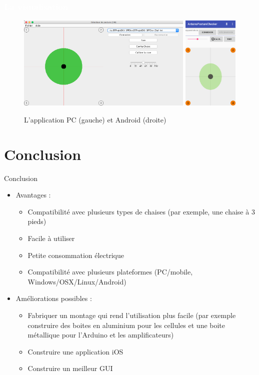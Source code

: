 \documentclass{beamer}
\begin{document}
\begin{frame}
\frametitle{\textcolor{white}{La visualisation}}
\begin{figure}[htbp]
\begin{center}
\includegraphics[height=4.5cm]{images/screenshot_pc1}
\includegraphics[height=4.5cm]{images/screenshot_android1.png}
\end{center}
\caption{L'application PC (gauche) et Android (droite)}
\label{fig:screenshot_pc}
\end{figure}
\end{frame}

\section{Conclusion}
\begin{frame}
\begin{block}{Conclusion}
\begin{itemize}
\item Avantages :
\begin{itemize}
\item Compatibilité avec plusieurs types de chaises (par exemple, une chaise à 3 pieds)
\item Facile à utiliser
\item Petite consommation électrique 
\item Compatibilité avec plusieurs plateformes (PC/mobile, Windows/OSX/Linux/Android)
\end{itemize}
\item Améliorations possibles :
\begin{itemize}
\item Fabriquer un montage qui rend l'utilisation plus facile (par exemple construire des boites en aluminium pour les cellules et une boite métallique pour l'Arduino et les amplificateurs)
\item Construire une application iOS
\item Construire un meilleur GUI
\end{itemize}
\end{itemize}
\end{block}
\end{frame}
\end{document}
